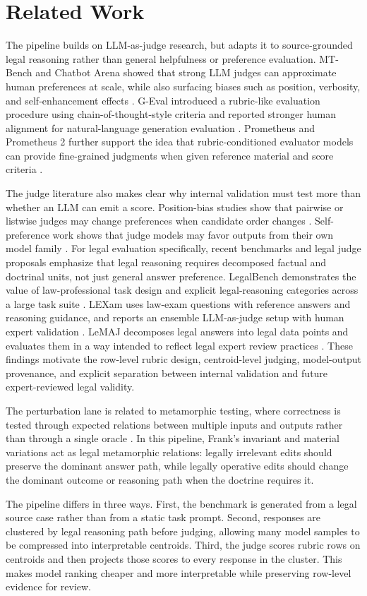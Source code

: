 \section{Related Work}

The pipeline builds on LLM-as-judge research, but adapts it to source-grounded
legal reasoning rather than general helpfulness or preference evaluation.
MT-Bench and Chatbot Arena showed that strong LLM judges can approximate human
preferences at scale, while also surfacing biases such as position, verbosity,
and self-enhancement effects \cite{zheng2023judging}. G-Eval introduced a
rubric-like evaluation procedure using chain-of-thought-style criteria and
reported stronger human alignment for natural-language generation evaluation
\cite{liu2023geval}. Prometheus and Prometheus 2 further support the idea that
rubric-conditioned evaluator models can provide fine-grained judgments when
given reference material and score criteria \cite{kim2023prometheus,
kim2024prometheus2}.

The judge literature also makes clear why internal validation must test more
than whether an LLM can emit a score. Position-bias studies show that pairwise
or listwise judges may change preferences when candidate order changes
\cite{shi2024positionbias}. Self-preference work shows that judge models may
favor outputs from their own model family \cite{wataoka2024selfpreference}.
For legal evaluation specifically, recent benchmarks and legal judge proposals
emphasize that legal reasoning requires decomposed factual and doctrinal units,
not just general answer preference. LegalBench demonstrates the value of
law-professional task design and explicit legal-reasoning categories across a
large task suite \cite{guha2023legalbench}. LEXam uses law-exam questions with
reference answers and reasoning guidance, and reports an ensemble LLM-as-judge
setup with human expert validation \cite{lexam2025}. LeMAJ decomposes legal
answers into legal data points and evaluates them in a way intended to reflect
legal expert review practices \cite{lemaj2025}. These findings motivate the
row-level rubric design, centroid-level judging, model-output provenance, and
explicit separation between internal validation and future expert-reviewed legal
validity.

The perturbation lane is related to metamorphic testing, where correctness is
tested through expected relations between multiple inputs and outputs rather
than through a single oracle \cite{chen2018metamorphic}. In this pipeline,
Frank's invariant and material variations act as legal metamorphic relations:
legally irrelevant edits should preserve the dominant answer path, while
legally operative edits should change the dominant outcome or reasoning path
when the doctrine requires it.

The pipeline differs in three ways. First, the benchmark is generated from a
legal source case rather than from a static task prompt. Second, responses are
clustered by legal reasoning path before judging, allowing many model samples to
be compressed into interpretable centroids. Third, the judge scores rubric rows
on centroids and then projects those scores to every response in the cluster.
This makes model ranking cheaper and more interpretable while preserving
row-level evidence for review.
